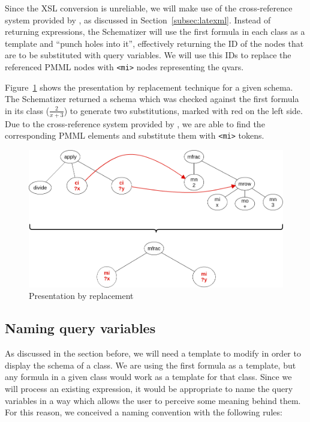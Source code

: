 Since the XSL conversion is unreliable, we will make use of the cross-reference
system provided by \latexml, as discussed in Section~\ref{subsec:latexml}.
Instead of returning \cmml expressions, the Schematizer will use the first
formula in each class as a template and ``punch holes into it'', effectively
returning the ID of the nodes that are to be substituted with query variables.
We will use this IDs to replace the referenced PMML nodes with \verb|<mi>|
nodes representing the qvars.

Figure~\ref{fig:replacement_pres} shows the presentation by replacement
technique for a given schema. The Schematizer returned a schema which was
checked against the first formula in its class ($\frac{2}{x+3}$) to generate
two substitutions, marked with red on the left side. Due to the cross-reference
system provided by \latexml, we are able to find the corresponding PMML
elements and substitute them with \verb|<mi>| tokens.

\begin{figure}[ht]\centering
    \includegraphics[scale=0.5]{img/replacement_pres.png}
    \caption{Presentation by replacement}\label{fig:replacement_pres}
\end{figure}
\FloatBarrier

\subsection{Naming query variables}\label{subsec:naming_qvars}
As discussed in the section before, we will need a template to modify in order
to display the schema of a class. We are using the first formula as a template,
but any formula in a given class would work as a template for that class.
Since we will process an existing expression, it would be appropriate to name
the query variables in a way which allows the user to perceive some meaning
behind them. For this reason, we conceived a naming convention with the
following rules:

